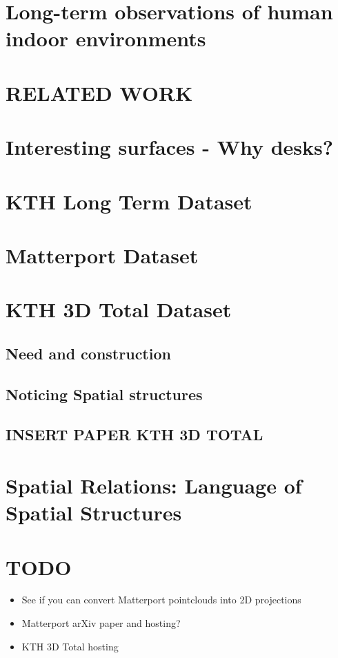
\section{Long-term observations of human indoor environments}
\section{RELATED WORK}
\section{Interesting surfaces - Why desks?}
\section{KTH Long Term Dataset}
\section{Matterport Dataset}
\section{KTH 3D Total Dataset}
\subsection{Need and construction}
\subsection{Noticing Spatial structures}
\subsection{INSERT PAPER KTH 3D TOTAL}
\section{Spatial Relations: Language of Spatial Structures}
\section{TODO}
\begin{itemize}
\item See if you can convert Matterport pointclouds into 2D projections
\item Matterport arXiv paper and hosting?
\item KTH 3D Total hosting
\end{itemize}

